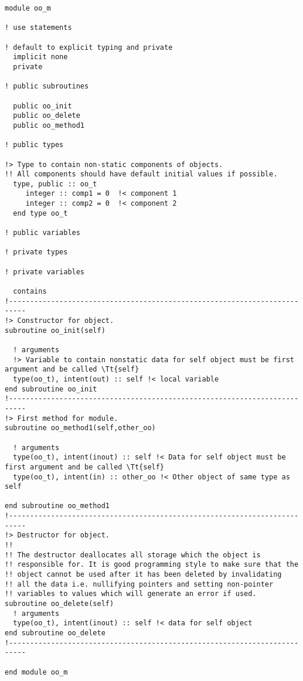 \small
\begin{verbatim}
module oo_m

! use statements

! default to explicit typing and private
  implicit none
  private

! public subroutines

  public oo_init
  public oo_delete
  public oo_method1

! public types

!> Type to contain non-static components of objects.
!! All components should have default initial values if possible.
  type, public :: oo_t
     integer :: comp1 = 0  !< component 1
     integer :: comp2 = 0  !< component 2
  end type oo_t

! public variables

! private types

! private variables

  contains
!--------------------------------------------------------------------------
!> Constructor for object.
subroutine oo_init(self)

  ! arguments
  !> Variable to contain nonstatic data for self object must be first argument and be called \Tt{self}
  type(oo_t), intent(out) :: self !< local variable
end subroutine oo_init
!--------------------------------------------------------------------------
!> First method for module.
subroutine oo_method1(self,other_oo)

  ! arguments
  type(oo_t), intent(inout) :: self !< Data for self object must be first argument and be called \Tt{self}
  type(oo_t), intent(in) :: other_oo !< Other object of same type as self

end subroutine oo_method1
!--------------------------------------------------------------------------
!> Destructor for object.
!!
!! The destructor deallocates all storage which the object is
!! responsible for. It is good programming style to make sure that the
!! object cannot be used after it has been deleted by invalidating
!! all the data i.e. nullifying pointers and setting non-pointer
!! variables to values which will generate an error if used.
subroutine oo_delete(self)
  ! arguments
  type(oo_t), intent(inout) :: self !< data for self object
end subroutine oo_delete
!--------------------------------------------------------------------------

end module oo_m
\end{verbatim}
\normalsize
